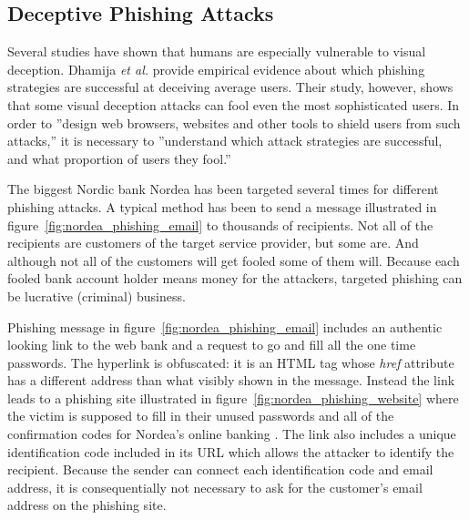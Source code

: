 \documentclass[english,gradu]{tktltiki}
\begin{document}
          \subsection{Deceptive Phishing Attacks}
             \label{sec:visual_deception}

              Several studies have shown \cite{visual_similarity_phishing_2008, why_phishing_works_06, suspectibility_to_phishing_2006} that humans are especially vulnerable to visual deception. Dhamija \emph{et al.} \cite{why_phishing_works_06} provide empirical evidence about which phishing strategies are successful at deceiving average users. Their study, however, shows that some visual deception attacks can fool even the most sophisticated users. In order to ''design web browsers, websites and other tools to shield users from such attacks,'' it is necessary to ''understand which attack strategies are successful, and what proportion of users they fool.'' \cite{why_phishing_works_06}

              The biggest Nordic bank Nordea has been targeted several times for different phishing attacks. A typical method has been to send a message illustrated in figure~\ref{fig:nordea_phishing_email} to thousands of recipients. Not all of the recipients are customers of the target service provider, but some are. And although not all of the customers will get fooled some of them will. Because each fooled bank account holder means money for the attackers, targeted phishing can be lucrative (criminal) business.

                Phishing message in figure~\ref{fig:nordea_phishing_email} includes an authentic looking link to the web bank and a request to go and fill all the one time passwords. The hyperlink is obfuscated: it is an HTML tag whose \emph{href} attribute has a different address than what visibly shown in the message. Instead the link leads to a phishing site illustrated in figure~\ref{fig:nordea_phishing_website} where the victim is supposed to fill in their unused passwords and all of the confirmation codes for Nordea's online banking \cite{nordea_fsecure_2006, nordea_miller_2006}. The link also includes a unique identification code included in its URL which allows the attacker to identify the recipient. Because the sender can connect each identification code and email address, it is consequentially not necessary to ask for the customer's email address on the phishing site.
\end{document}
